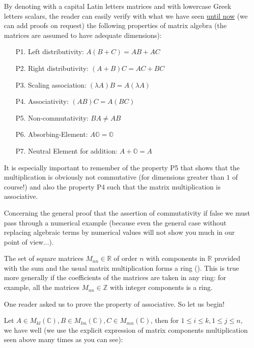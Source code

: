	By denoting with a capital Latin letters matrices and with lowercase Greek letters scalars, the reader can easily verify with what we have seen \underline{until now} (we can add proofs on request) the following properties of matrix algebra (the matrices are assumed to have adequate dimensions)\label{non-commutativity matrices}:
	\begin{enumerate}
		\item[P1.] Left distributivity: $A(B+C)=AB+AC$
		\item[P2.] Right distributivity: $(A+B)C=AC+BC$
		\item[P3.] Scaling association: $(\lambda A)B=A(\lambda A)$
		\item[P4.] Associativity: $(AB)C=A(BC)$
		\item[P5.] Non-commutativity: $BA\neq AB$
		\item[P6.] Absorbing-Element: $A\mathds{O}=\mathds{O}$
		\item[P7.] Neutral Element for addition: $A+\mathds{O}=A$
	\end{enumerate}
	It is especially important to remember of the property P5 that shows that the multiplication is obviously not commutative (for dimensions greater than $1$ of course!) and also the property P4 such that the matrix multiplication is associative.
	
	Concerning the general proof that the assertion of commutativity if false we must pass through a numerical example (because even the general case without replacing algebraic terms by numerical values will not show you much in our point of view...).
	
	\begin{tcolorbox}[title=Remark,colframe=black,arc=10pt]
	The set of square matrices $M_{nn}\in \mathbb{R}$ of order $n$ with components in $\mathbb{R}$ provided with the sum and the usual matrix multiplication forms a ring (). This is true more generally if the coefficients of the matrices are taken in any ring: for example, all the matrices $M_{nn}\in \mathbb{Z}$  with integer components is a ring.
	\end{tcolorbox}
	One reader asked us to prove the property of associative. So let us begin!
	
	Let $A\in M_{kl}(\mathbb{C}),B\in M_{lm}(\mathbb{C}),C\in M_{mn}(\mathbb{C})$, then for $1\leq i\leq k,1\leq j\leq n$, we have well (we use the explicit expression of matrix components multiplication seen above many times as you can see):
	
